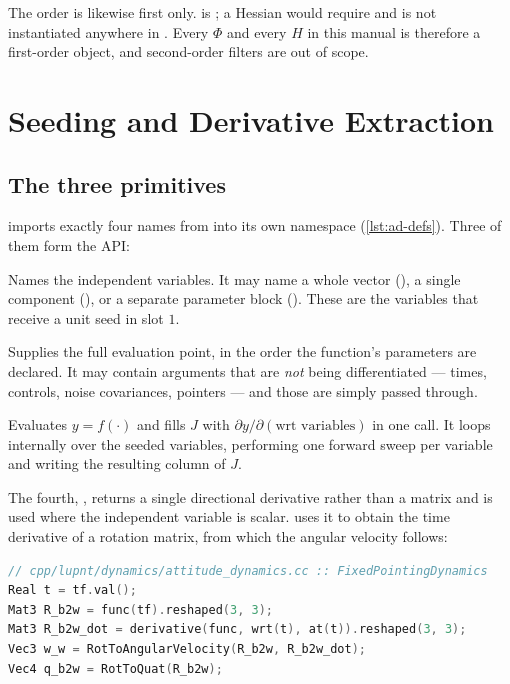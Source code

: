 The order is likewise first only.  is
; a Hessian would require  and is
not instantiated anywhere in \lupnt{}. Every $\Phi$ and every $H$ in this
manual is therefore a first-order object, and second-order filters are out of
scope.

\section{Seeding and Derivative Extraction}
\label{sec:ad-api}

\subsection{The three primitives}

\lupnt{} imports exactly four names from  into its own
namespace (\cref{lst:ad-defs}). Three of them form the API:

\begin{description}[leftmargin=1.8cm,style=nextline]
  \item[\code{wrt(...)}] Names the independent variables. It may name a whole
    vector (), a single component (), or a
    separate parameter block (). These are the variables that
    receive a unit seed in slot $1$.
  \item[\code{at(...)}] Supplies the full evaluation point, in the order the
    function's parameters are declared. It may contain arguments that are
    \emph{not} being differentiated --- times, controls, noise covariances,
    pointers --- and those are simply passed through.
  \item[\code{jacobian(f, wrt(...), at(...), y, J)}] Evaluates $y = f(\cdot)$
    and fills $J$ with $\partial y / \partial(\text{wrt variables})$ in one
    call. It loops internally over the seeded variables, performing one
    forward sweep per variable and writing the resulting column of $J$.
\end{description}

The fourth, , returns a single directional
derivative rather than a matrix and is used where the independent variable is
scalar.  uses it to obtain the time derivative of a
rotation matrix, from which the angular velocity follows:

\begin{lstlisting}[language=cpp, caption={Scalar directional derivative: $\dot{R}$ from $R(t)$ by AD in time. Source: \code{cpp/lupnt/dynamics/attitude\_dynamics.cc}}, label={lst:ad-derivative}]
// cpp/lupnt/dynamics/attitude_dynamics.cc :: FixedPointingDynamics
Real t = tf.val();
Mat3 R_b2w = func(tf).reshaped(3, 3);
Mat3 R_b2w_dot = derivative(func, wrt(t), at(t)).reshaped(3, 3);
Vec3 w_w = RotToAngularVelocity(R_b2w, R_b2w_dot);
Vec4 q_b2w = RotToQuat(R_b2w);
\end{lstlisting}


